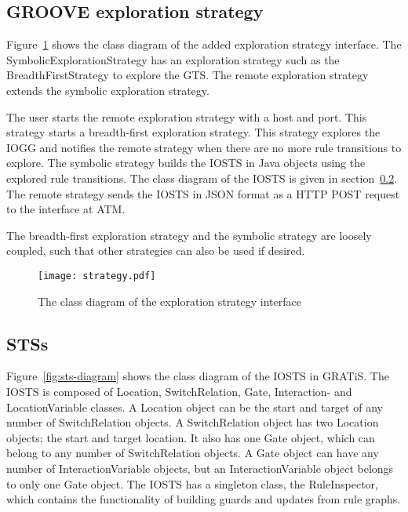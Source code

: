 \subsection{GROOVE exploration strategy}
Figure~\ref{fig:esi-diagram} shows the class diagram of the added exploration strategy interface. The SymbolicExplorationStrategy has an exploration strategy such as the BreadthFirstStrategy to explore the GTS. The remote exploration strategy extends the symbolic exploration strategy.

The user starts the remote exploration strategy with a host and port. This strategy starts a breadth-first exploration strategy. This strategy explores the IOGG and notifies the remote strategy when there are no more rule transitions to explore. The symbolic strategy builds the IOSTS in Java objects using the explored rule transitions. The class diagram  of the IOSTS is given in section~\ref{sec:sts-setup}. The remote strategy sends the IOSTS in JSON format as a HTTP POST request to the interface at ATM.

The breadth-first exploration strategy and the symbolic strategy are loosely coupled, such that other strategies can also be used if desired.
 
\begin{figure}[ht]
  \begin{center}
    \texttt{[image: strategy.pdf]}
  \end{center}
  \caption{The class diagram of the exploration strategy interface}
  \label{fig:esi-diagram}
\end{figure}

\subsection{STSs}\label{sec:sts-setup}
Figure~\ref{fig:sts-diagram} shows the class diagram of the IOSTS in GRATiS. The IOSTS is composed of Location, SwitchRelation, Gate, Interaction- and LocationVariable classes. A Location object can be the start and target of any number of SwitchRelation objects. A SwitchRelation object has two Location objects; the start and target location. It also has one Gate object, which can belong to any number of SwitchRelation objects. A Gate object can have any number of InteractionVariable objects, but an InteractionVariable object belongs to only one Gate object. The IOSTS has a singleton class, the RuleInspector, which contains the functionality of building guards and updates from rule graphs.

